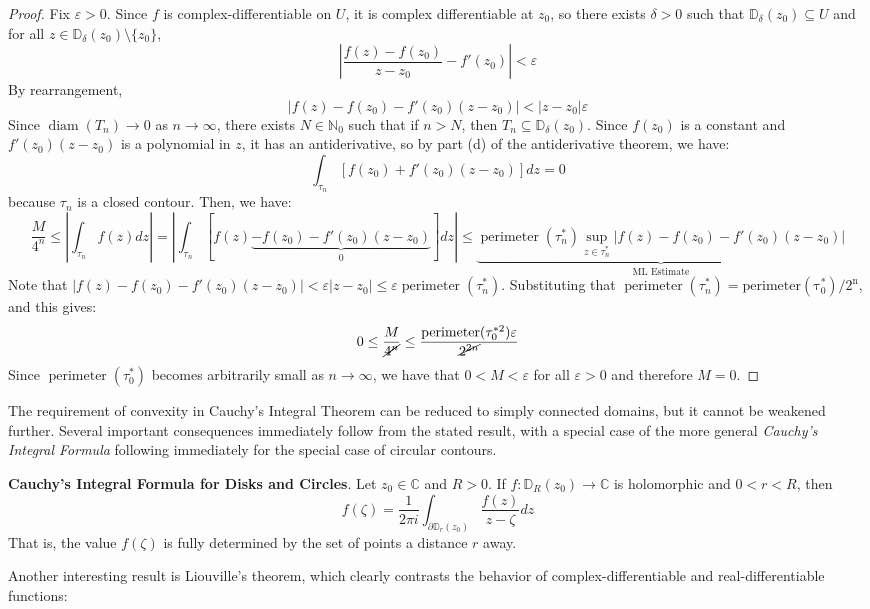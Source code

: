 \begin{framed}
\begin{proof}
        Fix $\varepsilon>0$. Since $f$ is complex-differentiable on $U$, it is complex differentiable at $z_0$, so there exists $\delta>0$ such that $\mathbb{D}_\delta (z_0)\subseteq U$ and for all $z\in \mathbb{D}_\delta(z_0)\setminus\{z_0\}$, \[\left|\frac{f(z)-f(z_0)}{z-z_0}-f'(z_0)\right| < \varepsilon\] By rearrangement, \[|f(z)-f(z_0) - f'(z_0)(z-z_0)| < |z-z_0|\varepsilon\] Since $\operatorname{diam}(T_n)\to 0$ as $n\to\infty$, there exists $N\in\mathbb{N}_0$ such that if $n>N$, then $T_n\subseteq \mathbb{D}_\delta(z_0)$. Since $f(z_0)$ is a constant and $f'(z_0)(z-z_0)$ is a polynomial in $z$, it has an antiderivative, so by part (d) of the antiderivative theorem, we have: \[\int_{\tau_n} [f(z_0) + f'(z_0)(z-z_0)]dz = 0\] because $\tau_n$ is a closed contour. Then, we have: \[\frac{M}{4^n} \leq \left|\int_{\tau_n} f(z)dz\right| = \left|\int_{\tau_n} [f(z) \underbrace{- f(z_0) - f'(z_0)(z-z_0)}_0]dz\right| \leq \underbrace{\operatorname{perimeter}(\tau^{*}_n) \sup_{z\in \tau_n^*} \left|f(z)-f(z_0)-f'(z_0)(z-z_0)\right|}_\text{ML Estimate}\] Note that $|f(z)-f(z_0)-f'(z_0)(z-z_0)| <\varepsilon |z-z_0| \leq \varepsilon\operatorname{perimeter}(\tau^*_n)$. Substituting that $\operatorname{perimeter}(\tau^*_n) = \operatorname{perimeter(\tau_0^*)/2^n}$, and this gives: \[0\leq \frac{M}{\cancel{4^n}} \leq \frac{\operatorname{perimeter}(\tau_0^{*2})\varepsilon}{\cancel{2^{2n}}}\] Since $\operatorname{perimeter}(\tau_0^*)$ becomes arbitrarily small as $n\to\infty$, we have that $0<M<\varepsilon$ for all $\varepsilon>0$ and therefore $M=0$.
    \end{proof}
\end{framed}

The requirement of convexity in Cauchy's Integral Theorem can be reduced to simply connected domains, but it cannot be weakened further. Several important consequences immediately follow from the stated result, with a special case of the more general \textit{Cauchy's Integral Formula} following immediately for the special case of circular contours. 

\textbf{Cauchy's Integral Formula for Disks and Circles}. Let $z_0\in\mathbb{C}$ and $R>0$. If $f:\mathbb{D}_R(z_0)\to\mathbb{C}$ is holomorphic and $0<r<R$, then \[f(\zeta) = \frac{1}{2\pi i} \int_{\partial\mathbb{D}_r(z_0)} \frac{f(z)}{z-\zeta} dz\] That is, the value $f(\zeta)$ is fully determined by the set of points a distance $r$ away.

Another interesting result is Liouville's theorem, which clearly contrasts the behavior of complex-differentiable and real-differentiable functions:

